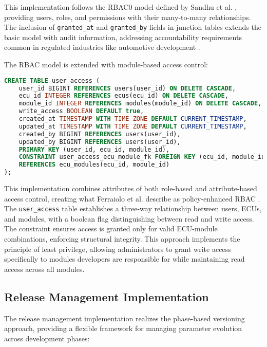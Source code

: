 This implementation follows the RBAC0 model defined by Sandhu et al. \cite{sandhu1998role}, providing users, roles, and permissions with their many-to-many relationships. The inclusion of \texttt{granted\_at} and \texttt{granted\_by} fields in junction tables extends the basic model with audit information, addressing accountability requirements common in regulated industries like automotive development \cite{staron2021automotive}.

The RBAC model is extended with module-based access control:

\begin{lstlisting}[language=SQL, caption={Module-Based Access Control Implementation}, label={lst:module-access-control}]
CREATE TABLE user_access (
    user_id BIGINT REFERENCES users(user_id) ON DELETE CASCADE,
    ecu_id INTEGER REFERENCES ecus(ecu_id) ON DELETE CASCADE,
    module_id INTEGER REFERENCES modules(module_id) ON DELETE CASCADE,
    write_access BOOLEAN DEFAULT true,
    created_at TIMESTAMP WITH TIME ZONE DEFAULT CURRENT_TIMESTAMP,
    updated_at TIMESTAMP WITH TIME ZONE DEFAULT CURRENT_TIMESTAMP,
    created_by BIGINT REFERENCES users(user_id),
    updated_by BIGINT REFERENCES users(user_id),
    PRIMARY KEY (user_id, ecu_id, module_id),
    CONSTRAINT user_access_ecu_module_fk FOREIGN KEY (ecu_id, module_id) 
    REFERENCES ecu_modules(ecu_id, module_id)
);
\end{lstlisting}

This implementation combines attributes of both role-based and attribute-based access control, creating what Ferraiolo et al. describe as policy-enhanced RBAC \cite{ferraiolo2011policy}. The \texttt{user\_access} table establishes a three-way relationship between users, ECUs, and modules, with a boolean flag distinguishing between read and write access. The constraint ensures access is granted only for valid ECU-module combinations, enforcing structural integrity. This approach implements the principle of least privilege, allowing administrators to grant write access specifically to modules developers are responsible for while maintaining read access across all modules.

\subsection{Release Management Implementation}
\label{subsec:release-management-implementation}

The release management implementation realizes the phase-based versioning approach, providing a flexible framework for managing parameter evolution across development phases:

